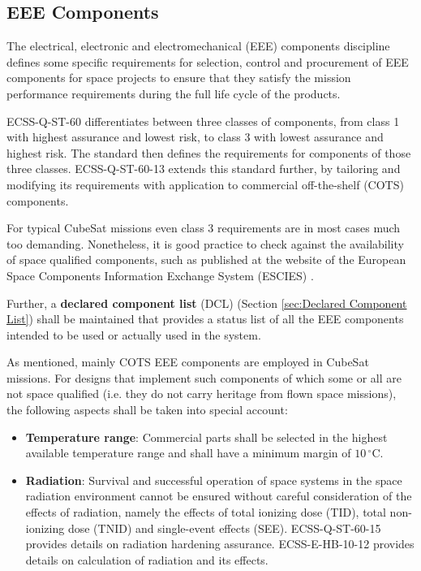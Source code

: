 \subsection{EEE Components}

The electrical, electronic and electromechanical (EEE) components discipline defines some specific requirements for selection, control and procurement of EEE components for space projects to ensure that they satisfy the mission performance requirements during the full life cycle of the products.  

ECSS-Q-ST-60 \cite{ECSS-Q-ST-60} differentiates between three classes of components, from class 1 with highest assurance and lowest risk, to class 3 with lowest assurance and highest risk. The standard then defines the requirements for components of those three classes. ECSS-Q-ST-60-13 \cite{ECSS-Q-ST-60-13} extends this standard further, by tailoring and modifying its requirements with application to commercial off-the-shelf (COTS) components. 

For typical CubeSat missions even class 3 requirements are in most cases much too demanding. Nonetheless, it is good practice to check against the availability of space qualified components, such as published at the website of the European Space Components Information Exchange System (ESCIES) \cite{escies.org}. 

Further, a \textbf{declared component list} (DCL) (Section \ref{sec:Declared Component List}) shall be maintained that provides a status list of all the EEE components intended to be used or actually used in the system.

As mentioned, mainly COTS EEE components are employed in CubeSat missions. For designs that implement such components of which some or all are not space qualified (i.e. they do not carry heritage from flown space missions), the following aspects shall be taken into special account: 

\begin{itemize}
\item \textbf{Temperature range}: Commercial parts shall be selected in the highest available temperature range and shall have a minimum margin of $10\,^{\circ}\mathrm{C}$.
\item \textbf{Radiation}: Survival and successful operation of space systems in the space radiation environment cannot be ensured without careful consideration of the effects of radiation, namely the effects of total ionizing dose (TID), total non-ionizing dose (TNID) and single-event effects (SEE). ECSS-Q-ST-60-15 \cite{ECSS-Q-ST-60-15} provides details on radiation hardening assurance. ECSS-E-HB-10-12 \cite{ECSS-E-HB-10-12} provides details on calculation of radiation and its effects.
\end{itemize}

